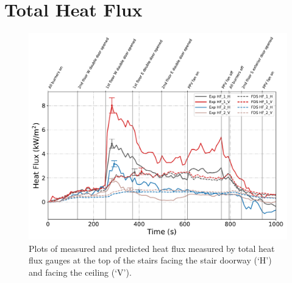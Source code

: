 \clearpage
\section{Total Heat Flux}
\begin{figure}[!h]
	\centering
	\includegraphics[width=\columnwidth]{Figures/Plots/Validation/Heat_Flux/Test_23_HFs}
	\caption[Plots of measured and predicted heat flux during Test~23.]{Plots of measured and predicted heat flux measured by total heat flux gauges at the top of the stairs facing the stair doorway (`H') and facing the ceiling (`V').}
	\label{fig:Test5_HFs}
\end{figure}
